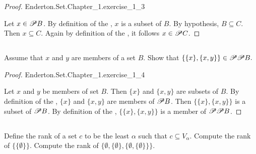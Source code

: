 \documentclass{report}
\begin{document}
\begin{proof}

    {Enderton.Set.Chapter\_1.exercise\_1\_3}

  Let $x \in \mathscr{P}B$.
  By definition of the , $x$ is a subset of $B$.
  By hypothesis, $B \subseteq C$.
  Then $x \subseteq C$.
  Again by definition of the , it follows
    $x \in \mathscr{P}C$.

\end{proof}

\subsection{}%

Assume that $x$ and $y$ are members of a set $B$.
Show that $\{\{x\}, \{x, y\}\} \in \mathscr{P}\mathscr{P}B.$

\begin{proof}

    {Enderton.Set.Chapter\_1.exercise\_1\_4}

  Let $x$ and $y$ be members of set $B$.
  Then $\{x\}$ and $\{x, y\}$ are subsets of $B$.
  By definition of the , $\{x\}$ and $\{x, y\}$ are
    members of $\mathscr{P}B$.
  Then $\{\{x\}, \{x, y\}\}$ is a subset of $\mathscr{P}B$.
  By definition of the , $\{\{x\}, \{x, y\}\}$ is a
    member of $\mathscr{P}\mathscr{P}B$.

\end{proof}

\subsection{}%

Define the rank of a set $c$ to be the least $\alpha$ such that
  $c \subseteq V_\alpha$.
Compute the rank of $\{\{\emptyset\}\}$.
Compute the rank of
  $\{\emptyset, \{\emptyset\}, \{\emptyset, \{\emptyset\}\}\}$.
\end{document}
